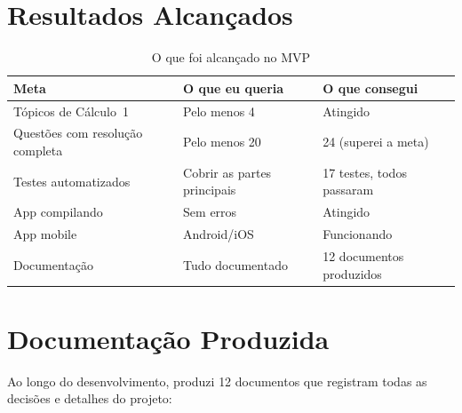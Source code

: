 \documentclass[12pt, a4paper]{article}
\begin{document}
\section{Resultados Alcan\c{c}ados}

\begin{table}[H]
\centering
\small
\renewcommand{\arraystretch}{1.15}
\caption{O que foi alcan\c{c}ado no MVP}
\begin{tabularx}{\textwidth}{X l l}
\toprule
\textbf{Meta} & \textbf{O que eu queria} & \textbf{O que consegui} \\
\midrule
T\'{o}picos de C\'{a}lculo~1 & Pelo menos 4 & Atingido \\
Quest\~{o}es com resolu\c{c}\~{a}o completa & Pelo menos 20 & 24 (superei a meta) \\
Testes automatizados & Cobrir as partes principais & 17 testes, todos passaram \\
App compilando & Sem erros & Atingido \\
App mobile & Android/iOS & Funcionando \\
Documenta\c{c}\~{a}o & Tudo documentado & 12 documentos produzidos \\
\bottomrule
\end{tabularx}
\end{table}

\section{Documenta\c{c}\~{a}o Produzida}

Ao longo do desenvolvimento, produzi 12 documentos que registram todas as decis\~{o}es e detalhes do projeto:
\end{document}
